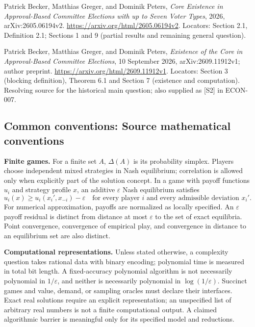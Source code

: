 \documentclass[11pt,a4paper]{article}
\begin{document}
\noindent[S2] Patrick Becker, Matthias Greger, and Dominik Peters,
\emph{Core Existence in Approval-Based Committee Elections with up to
Seven Voter Types}, 2026, arXiv:2605.06194v2.
\url{https://arxiv.org/html/2605.06194v2}.
Locators: Section 2.1, Definition 2.1; Sections 1 and 9
(partial results and remaining general question).

\noindent[S3] Patrick Becker, Matthias Greger, and Dominik Peters,
\emph{Existence of the Core in Approval-Based Committee Elections},
10 September 2026, arXiv:2609.11912v1; author preprint.
\url{https://arxiv.org/html/2609.11912v1}.
Locators: Section 3 (blocking definition), Theorem 6.1 and Section 7
(existence and computation). Resolving source for the historical main question;
also supplied as [S2] in ECON-007.
\par\endgroup

\subsection*{Common conventions: Source mathematical conventions}

\textbf{Finite games.} For a finite set $A$, $\Delta(A)$ is its probability
simplex. Players choose independent mixed strategies in Nash equilibrium;
correlation is allowed only when explicitly part of the solution concept.
In a game with payoff functions $u_i$ and strategy profile $x$, an additive
$\varepsilon$ Nash equilibrium satisfies
\[
 u_i(x)\geq u_i(x_i',x_{-i})-\varepsilon
 \quad\text{for every player $i$ and every admissible deviation $x_i'$}.
\]
For numerical approximation, payoffs are normalized as locally specified.
An $\varepsilon$ payoff residual is distinct from distance at most
$\varepsilon$ to the set of exact equilibria. Point convergence, convergence
of empirical play, and convergence in distance to an equilibrium set are
also distinct.

\textbf{Computational representations.} Unless stated otherwise, a complexity
question takes rational data with binary encoding; polynomial time is measured
in total bit length. A fixed-accuracy polynomial algorithm is not necessarily
polynomial in $1/\varepsilon$, and neither is necessarily polynomial in
$\log(1/\varepsilon)$. Succinct games and value, demand, or sampling oracles
must declare their interfaces. Exact real solutions require an explicit
representation; an unspecified list of arbitrary real numbers is not a
finite computational output. A claimed algorithmic barrier is meaningful
only for its specified model and reductions.
\end{document}
